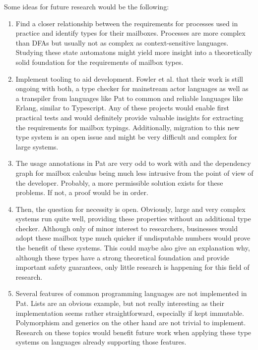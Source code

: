 Some ideas for future research would be the following:
\begin{enumerate}
    \item Find a closer relationship between the requirements for processes used in practice and identify types for their mailboxes. Processes are more complex than DFAs but usually not as complex as context-sensitive languages. Studying these state automatons might yield more insight into a theoretically solid foundation for the requirements of mailbox types.
    \item Implement tooling to aid development. Fowler et al.\cite{fowlerSpecialDeliveryProgramming2023} that their work is still ongoing with both, a type checker for mainstream actor languages as well as a transpiler from languages like Pat to common and reliable languages like Erlang, similar to Typescript. Any of these projects would enable first practical tests and would definitely provide valuable insights for extracting the requirements for mailbox typings. Additionally, migration to this new type system is an open issue and might be very difficult and complex for large systems.
    \item The usage annotations in Pat are very odd to work with and the dependency graph for mailbox calculus being much less intrusive from the point of view of the developer. Probably, a more permissible solution exists for these problems. If not, a proof would be in order.
    \item Then, the question for necessity is open. Obviously, large and very complex systems run quite well, providing these properties without an additional type checker. Although only of minor interest to researchers, businesses would adopt these mailbox type much quicker if undisputable numbers would prove the benefit of these systems. This could maybe also give an explanation why, although these types have a strong theoretical foundation and provide important safety guarantees, only little research is happening for this field of research.
    \item Several features of common programming languages are not implemented in Pat. Lists are an obvious example, but not really interesting as their implementation seems rather straightforward, especially if kept immutable. Polymorphism and generics on the other hand are not trivial to implement. Research on these topics would benefit future work when applying these type systems on languages already supporting those features.
\end{enumerate}



